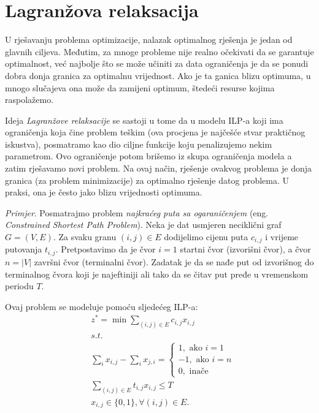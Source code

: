 \documentclass[a4paper, utf8, 11pt, colorlinks]{book}
\begin{document}
\section{Lagranžova relaksacija}
U rješavanju problema optimizacije, nalazak optimalnog rješenja je jedan od glavnih ciljeva. Međutim, za mnoge probleme nije realno očekivati da se garantuje optimalnost, već najbolje što se može učiniti za data ograničenja  je da se ponudi dobra donja granica za optimalnu vrijednost. Ako je ta ganica blizu optimuma, u mnogo slučajeva ona može da zamijeni optimum, štedeći resurse kojima raspolažemo. 

Ideja \emph{Lagranžove relaksacije} se sastoji u tome da u modelu ILP-a  koji ima  ograničenja koja čine problem teškim (ova procjena je najčešće stvar praktičnog iskustva),  posmatramo kao dio ciljne funkcije koju penalizujemo nekim parametrom.  %
Ovo ograničenje potom brišemo iz skupa ograničenja modela a zatim rješavamo novi problem. Na ovaj način, rješenje ovakvog problema je donja granica (za problem minimizacije) za optimalno rješenje datog problema. U praksi, ona je često jako blizu vrijednosti optimuma. 

\emph{Primjer}. Posmatrajmo problem \emph{najkraćeg puta sa ogaraničenjem} (eng. \emph{Constrained Shortest Path Problem}). Neka je dat usmjeren neciklični graf $G=(V,E)$. Za svaku granu $(i,j) \in E$ dodijelimo cijenu puta $c_{i,j}$ i vrijeme putovanja $t_{i,j}$. Pretpostavimo da je čvor $i=1$ startni čvor (izvorišni čvor), a čvor $n = |V|$   završni čvor (terminalni čvor). Zadatak je da se nađe put  od izvorišnog do terminalnog čvora koji je najeftiniji ali tako da se čitav put pređe u vremenskom periodu $T$.

Ovaj problem se modeluje pomoću sljedećeg ILP-a:
 \begin{align}
    &z^*=\min\sum_{(i,j) \in E }c_{i,j}x_{i,j} \\
    &{s.t. }\\
    & \sum_{i} x_{i,j} - \sum_{i} x_{j,i} = \begin{cases}  
                                               1, \mbox{ ako } i=1 \\
                                              -1, \mbox{ ako } i=n \\
                                               0, \mbox{ inače }
                                            \end{cases} \\
    & \sum_{(i,j) \in E} t_{i,j} x_{i,j} \leq T \\
    & x_{i,j} \in \{0, 1 \}, \forall (i,j) \in E.
\end{align} 
\end{document}
